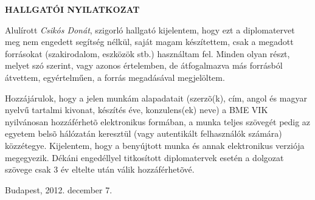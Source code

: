\begin{center} 
\large
\textbf{HALLGATÓI NYILATKOZAT}\\
\end{center}

Alulírott \emph{Csikós Donát}, szigorló hallgató kijelentem, hogy ezt a
diplomatervet meg nem  engedett segítség
nélkül, saját magam készítettem, csak a megadott forrásokat (szakirodalom,
eszközök stb.) használtam fel. Minden olyan részt, melyet szó szerint, vagy
azonos értelemben, de átfogalmazva más forrásból átvettem, egyértelműen, a
forrás megadásával megjelöltem.

Hozzájárulok, hogy a jelen munkám alapadatait (szerzõ(k), cím, angol és magyar
nyel\-vű tartalmi kivonat, készítés éve, konzulens(ek) neve) a BME VIK
nyilvánosan hozzáférhetõ elektronikus formában, a munka teljes szövegét pedig
az egyetem belsõ hálózatán keresztül (vagy autentikált felhasználók számára)
közzétegye. Kijelentem, hogy a benyújtott munka és annak elektronikus verziója
megegyezik. Dékáni engedéllyel titkosított diplomatervek esetén a dolgozat
szövege csak 3 év eltelte után válik hozzáférhetõvé.

\begin{flushleft}
\vspace*{1cm}
Budapest, 2012. december 7.
\end{flushleft}

\begin{flushright}
 \vspace*{1cm}
 \makebox[7cm]{\rule{6cm}{.4pt}}\\
 \\
\end{flushright}
\thispagestyle{empty}

\vfill
\clearpage
\thispagestyle{empty} %